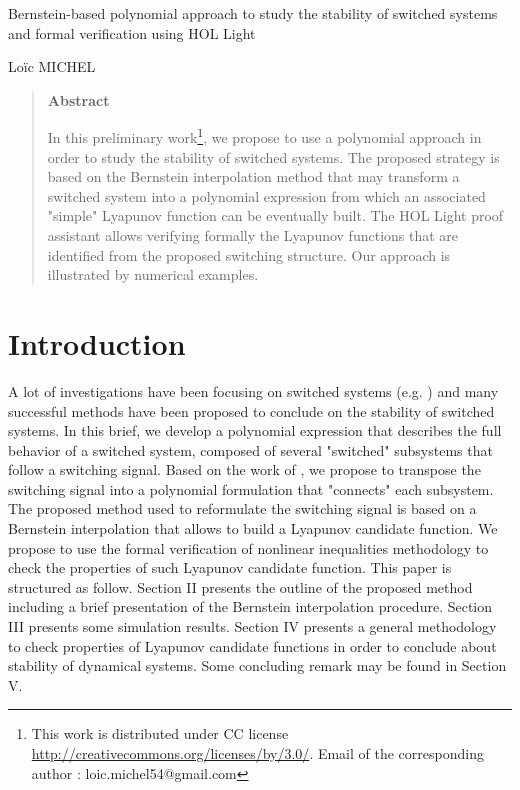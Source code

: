 \documentclass[12pt]{article}
\begin{document}
\thispagestyle{empty}
\vfill
\begin{center} {\Large Bernstein-based polynomial approach to study the stability of switched systems and formal verification using HOL Light} \end{center}
\vfill
\begin{center}{\sc Lo\"ic MICHEL} \end{center}

\begin{center}
\end{center}
\vfill

\begin{quotation}                \begin{center} {\bf Abstract} \end{center}
\noindent
In this preliminary work\footnote{This work is distributed under CC license \url{http://creativecommons.org/licenses/by/3.0/}. Email of the corresponding author : loic.michel54@gmail.com},
we propose to use a polynomial approach 
in order to study the stability of switched systems. The proposed strategy is based on the Bernstein interpolation method that may transform a switched system into a polynomial
expression from which an associated "simple" Lyapunov function can be eventually built. The HOL Light proof assistant allows verifying formally 
the Lyapunov functions that are identified from the proposed switching structure. Our approach is illustrated by numerical examples.
\end{quotation}
\vfill
\vfill
\def\thefootnote{\fnsymbol{footnote}}
\setcounter{footnote}{0}

\newpage
\setcounter{page}{1}
\section{Introduction}
A lot of investigations have been focusing on switched systems (e.g. \cite{Liber} \cite{Liber2} \cite{Lin} \cite{Shorten} \cite{Eben}) and many successful methods have 
been proposed to conclude on the stability of switched systems. 
In this brief, we develop a polynomial expression that describes the full behavior of a switched system, composed of several "switched" 
subsystems that follow a switching signal. Based on the work of \cite{Mojica}, we propose to transpose the switching signal into a polynomial formulation that "connects" each 
subsystem. The proposed method used to reformulate the switching signal is based on a Bernstein interpolation that allows to build a Lyapunov candidate function. We propose to use the formal verification of nonlinear inequalities methodology to check the properties of such Lyapunov candidate function. 
This paper is structured as follow. Section II presents the outline of the proposed method including a brief presentation of the Bernstein interpolation procedure. Section III presents
some simulation results. Section IV presents a general methodology to check properties of Lyapunov candidate functions in order to conclude about stability of dynamical systems.
Some concluding remark may be found in Section V.
\end{document}
